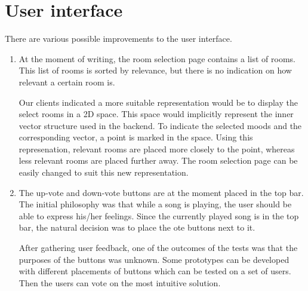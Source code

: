\clearpage
\section{User interface}
There are various possible improvements to the user interface.

\begin{enumerate}
\item At the moment of writing, the room selection page contains a list of rooms.
This list of rooms is sorted by relevance, but there is no indication on how relevant a certain room is.

Our clients indicated a more suitable representation would be to display the select rooms in a 2D space.
This space would implicitly represent the inner vector structure used in the backend.
To indicate the selected moods and the corresponding vector, a point is marked in the space.
Using this represenation, relevant rooms are placed more closely to the point, whereas less relevant rooms are placed further away. The room selection page can be easily changed to suit this new representation.

\item The up-vote and down-vote buttons are at the moment placed in the top bar.
The initial philosophy was that while a song is playing, the user should be able to express his/her feelings.
Since the currently played song is in the top bar, the natural decision was to place the ote buttons next to it.

After gathering user feedback, one of the outcomes of the tests was that the purposes of the buttons was unknown.
Some prototypes can be developed with different placements of buttons which can be tested on a set of users.
Then the users can vote on the most intuitive solution.
\end{enumerate}
